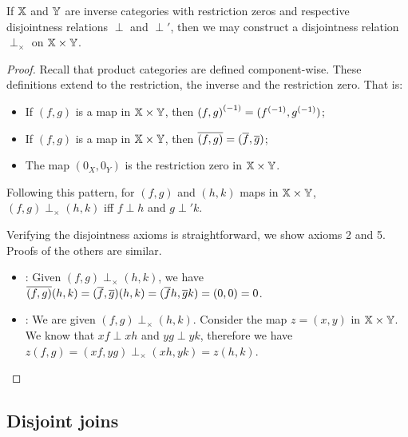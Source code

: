 \begin{lemma}\label{lem:disjointness_is_derivable_on_a_product_category}
  If $\mathbb{X}$ and $\mathbb{Y}$ are inverse categories with restriction zeros and respective disjointness
  relations $\perp$ and $\perp'$, then we may construct a disjointness relation
  $\perp_{\times}$ on $\mathbb{X}\times\mathbb{Y}$.
\end{lemma}
\begin{proof}
  Recall that product categories are defined component-wise. These definitions extend to the
  restriction, the inverse and the restriction zero. That is:
  \begin{itemize}
    \item If $(f,g)$ is a map in $\mathbb{X}\times\mathbb{Y}$, then ${(f,g)}^{(-1)} = ({f}^{(-1)}, {g}^{(-1)})$;
    \item If $(f,g)$ is a map in $\mathbb{X}\times\mathbb{Y}$, then $\overline{(f,g)} = (\overline{f}, \overline{g})$;
    \item The map $(0_X,0_Y)$ is the restriction zero in $\mathbb{X}\times\mathbb{Y}$.
  \end{itemize}

  Following this pattern, for $(f,g)$ and $(h,k)$ maps in $\mathbb{X}\times\mathbb{Y}$, $(f,g) \perp_{\times}(h,k)$
  iff $f\perp h$ and $g\perp' k$.

  Verifying the disjointness axioms is straightforward, we show axioms 2 and 5. Proofs of the
  others are similar.
  {
  \begin{itemize}
    \item [\axiom{Dis}{2}]: Given $(f,g)\perp_{\times}(h,k)$, we have
      $\overline{(f,g)}(h,k) =  (\overline{f},\overline{g})(h,k) = (\overline{f} h, \overline{g} k) = (0, 0) = 0$.
    \item [\axiom{Dis}{5}]: We are given $(f,g)\perp_{\times}(h,k)$. Consider the map $z = (x,y)$
      in $\mathbb{X} \times \mathbb{Y}$. We know that $x f \perp x h$ and $y g \perp y k$, therefore we have
      $z(f,g) = (x f, y g) \perp_{\times} (x h, y k) = z(h,k)$.
  \end{itemize}
  }
\end{proof}
\subsection{Disjoint joins} %
\label{sub:disjoint_joins}

